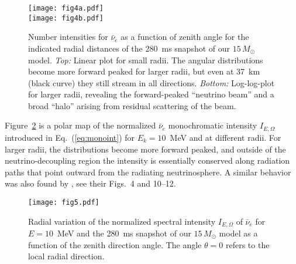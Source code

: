 \documentclass[iop,twocolappendix,numberedappendix]{emulateapj}
\begin{document}

\begin{figure}
\begin{center}
  \texttt{[image: fig4a.pdf]}\\
 \hspace{-2.6mm}\texttt{[image: fig4b.pdf]}
  \caption{Number intensities for $\bar\nu_e$ as a function of zenith angle
  for the indicated radial distances of the 280~ms snapshot of our
  $15\,M_\odot$ model. {\em Top:} Linear plot for small radii.
  The angular distributions become more forward peaked for larger radii, but
  even at 37~km (black curve) they still stream in all directions.
  {\em Bottom:} Log-log-plot for larger radii, revealing the forward-peaked
  ``neutrino beam'' and a broad ``halo'' arising from residual scattering
  of the beam.}
   \label{fig:angular_distributions}
\end{center}
\end{figure}

Figure~\ref{fig:polarmap} is a polar map of the normalized $\bar{\nu}_e$
monochromatic intensity $I_{E,\Omega}$ introduced in Eq.~(\ref{eq:monoint})
for $E_k=10$~MeV and at different radii. For larger radii, the distributions
become more forward peaked, and outside of the neutrino-decoupling region
the intensity is essentially conserved along radiation paths that point outward
from the radiating neutrinosphere.
A similar behavior was also found by
\cite{Thompson:2002mw}, see their Figs.~4 and 10--12.

\begin{figure}
\begin{center}
  \texttt{[image: fig5.pdf]}
  \caption{Radial variation of the 
  normalized spectral intensity $I_{E,\Omega}$ of $\bar{\nu}_e$ for $E=10$~MeV and
  the 280~ms snapshot of our
  $15\,M_\odot$ model as a function of the zenith direction angle. The angle
  $\theta =0$ refers to the local radial direction.
 }
   \label{fig:polarmap}
\end{center}
\end{figure}
\end{document}
